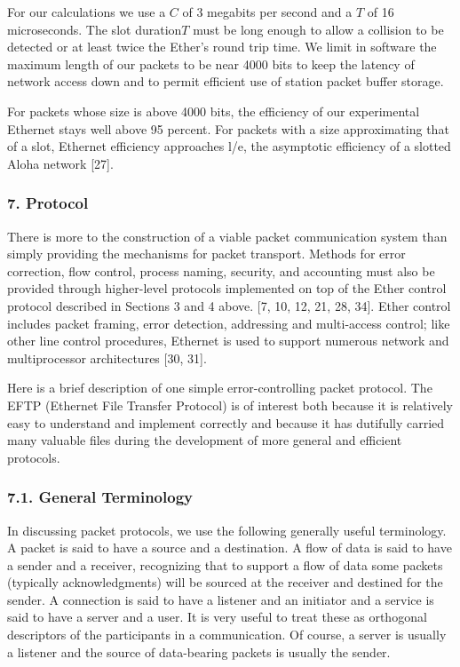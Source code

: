 For our calculations we use a $C$ of 3 megabits per second and a $T$ of 16 microseconds. The slot duration$T$ must be long enough to allow a collision to be detected or at least twice the Ether's round trip time. We limit in software the maximum length of our packets to be near 4000 bits to keep the latency of network access down and to permit efficient use of station packet buffer storage.

For packets whose size is above 4000 bits, the efficiency of our experimental Ethernet stays well above 95  percent. For packets with a size approximating that of a slot, Ethernet efficiency approaches l/e, the asymptotic efficiency of a slotted Aloha network [27].
\vspace{\fill} \pagebreak

\vspace{-10pt} 
\subsubsection*{7. Protocol}
\vspace{-6pt} 
There is more to the construction of a viable packet communication system than simply providing the mechanisms for packet transport. Methods for error correction, flow control, process naming, security, and accounting must also be provided through higher-level protocols implemented on top of the Ether control protocol described in Sections 3 and 4 above. [7, 10, 12, 21, 28, 34]. Ether control includes packet framing, error detection, addressing and multi-access control; like other line control procedures, Ethernet is used to support numerous network and multiprocessor architectures [30, 31].

Here is a brief description of one simple error-controlling packet protocol. The EFTP (Ethernet File Transfer Protocol) is of interest both because it is relatively easy to understand and implement correctly and because it has dutifully carried many valuable files during the development of more general and efficient protocols.
\vspace{-10pt} 

\subsubsection{7.1. General Terminology}
\vspace{-6pt} 
In discussing packet protocols, we use the following generally useful terminology. A packet is said to have a source and a destination. A flow of data is said to have a sender and a receiver, recognizing that to support a flow of data some packets (typically acknowledgments) will be sourced at the receiver and destined for the sender. A connection is said to have a listener and an initiator and a service is said to have a server and a user. It is very useful to treat these as orthogonal descriptors of the participants in a communication. Of course, a server is usually a listener and the source of data-bearing packets is usually the sender.

